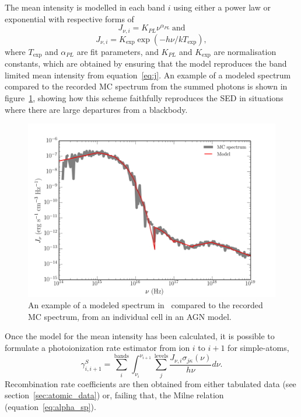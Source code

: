 The mean intensity is modelled in each band $i$ using either a power law or exponential
with respective forms of
\begin{equation}
J_{\nu,i} = K_{PL} \nu^{\alpha_{PL}}~\mathrm{and}
\end{equation}
\begin{equation}
J_{\nu,i} = K_{\exp} \exp(-h\nu / k T_{\exp}),
\end{equation}
where $T_{\exp}$ and $\alpha_{PL}$ are fit parameters, and $K_{PL}$ and $K_{\exp}$ 
are normalisation constants, which are obtained by ensuring that
the model reproduces the band limited mean intensity from equation~\ref{eq:j}.
An example of a modeled spectrum compared to the recorded MC spectrum from
the summed photons is shown in figure~\ref{fig:cell_spec}, showing how
this scheme faithfully reproduces the SED in situations where there are large departures
from a blackbody. 

\begin{figure}
\centering
\includegraphics[width=1.0\textwidth]{figures/03-radtrans/cell_spec.png}
\caption
{
An example of a modeled spectrum in \py\ compared to the recorded MC spectrum,
from an individual cell in an AGN model.
} 
\label{fig:cell_spec}
\end{figure}

Once the model for the mean intensity has been calculated, it is possible
to formulate a photoionization rate estimator from ion $i$ to $i+1$ 
for simple-atoms,
\begin{equation}
\gamma_{i,i+1}^S = \sum_i^{\mathrm{bands}} \int_{\nu_i}^{\nu_{i+1}} 
\sum_j^{\mathrm{levels}} \frac{J_{\nu,i} \sigma_{j\kappa}(\nu) }{h \nu} d\nu.
\end{equation}
Recombination rate coefficients are then obtained from 
either tabulated data (see section~\ref{sec:atomic_data})
or, failing that, the Milne relation (equation~\ref{eq:alpha_sp}).

